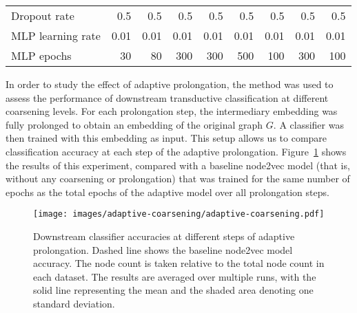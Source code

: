 \begin{table}
\begin{tabular}{lrrrrrrrr}
    Dropout rate             & 0.5           & 0.5               & 0.5             & 0.5           & 0.5             & 0.5           & 0.5            & 0.5               \\
    MLP learning rate        & 0.01          & 0.01              & 0.01            & 0.01          & 0.01            & 0.01          & 0.01           & 0.01              \\
    MLP epochs               & 30            & 80                & 300             & 300           & 500             & 100           & 300            & 100               \\
    \bottomrule
  \end{tabular}
\end{table}

In order to study the effect of adaptive prolongation, the method was used to assess the performance of downstream transductive classification at different coarsening levels. For each prolongation step, the intermediary embedding was fully prolonged to obtain an embedding of the original graph \( G \). A classifier was then trained with this embedding as input. This setup allows us to compare classification accuracy at each step of the adaptive prolongation. Figure~\ref{fig:adaptive-coarsening} shows the results of this experiment, compared with a baseline node2vec model (that is, without any coarsening or prolongation) that was trained for the same number of epochs as the total epochs of the adaptive model over all prolongation steps.

\begin{figure}
  \centering
  \texttt{[image: images/adaptive-coarsening/adaptive-coarsening.pdf]}
  \caption{Downstream classifier accuracies at different steps of adaptive prolongation. Dashed line shows the baseline node2vec model accuracy. The node count is taken relative to the total node count in each dataset. The results are averaged over multiple runs, with the solid line representing the mean and the shaded area denoting one standard deviation.}
  \label{fig:adaptive-coarsening}
\end{figure}

